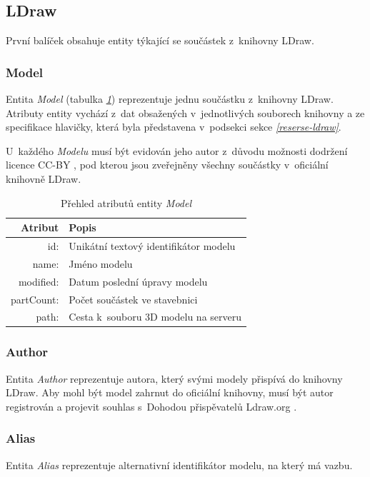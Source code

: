 \subsection{LDraw}
První balíček obsahuje entity týkající se součástek z~knihovny LDraw.

\subsubsection*{Model}
  Entita \textit{Model} (tabulka \emph{\ref{table:entity:model}}) reprezentuje jednu součástku z~knihovny LDraw. Atributy entity vychází z~dat obsažených v~jednotlivých souborech knihovny a ze specifikace hlavičky, která byla představena v~podsekci \emph{} sekce \emph{\ref{reserse-ldraw}}.
    
  U~každého \textit{Modelu} musí být evidován jeho autor z~důvodu možnosti dodržení licence \gls{CC-BY} \cite{CC-BY}, pod kterou jsou zveřejněny všechny součástky v~oficiální knihovně LDraw. 
  
  \begin{table}[th!]
  \centering
  \caption{Přehled atributů entity \textit{Model}}
  \label{table:entity:model}
  \begin{tabularx}{\textwidth}{@{}rX@{}}
  \toprule
  Atribut & Popis
  \\ 
  \midrule
  id: & Unikátní textový identifikátor modelu
  \\
  name: & Jméno modelu 
  \\
  modified: & Datum poslední úpravy modelu 
  \\
  partCount: & Počet součástek ve stavebnici
  \\
  path: & Cesta k~souboru 3D modelu na serveru
  \\
  \bottomrule
  \end{tabularx}
  \end{table}

\subsubsection*{Author}
Entita \textit{Author} reprezentuje autora, který svými modely přispívá do knihovny LDraw. Aby mohl být model zahrnut do oficiální knihovny, musí být autor registrován a projevit souhlas s~Dohodou přispěvatelů Ldraw.org \autocite{ldraw:agreement}.
  
\subsubsection*{Alias}
Entita \textit{Alias} reprezentuje alternativní identifikátor modelu, na který má vazbu. 


